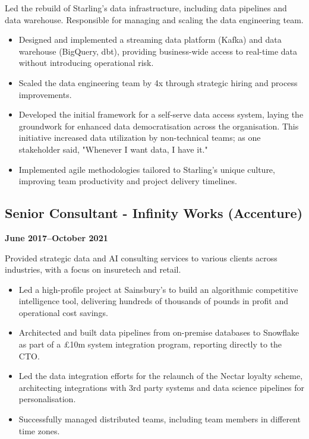 \documentclass[a4paper]{scrartcl}
\begin{document}
Led the rebuild of Starling's data infrastructure, including data pipelines and data warehouse. Responsible for managing and scaling the data engineering team.
\begin{itemize}
	\item Designed and implemented a streaming data platform (Kafka) and data warehouse (BigQuery, dbt), providing business-wide access to real-time data without introducing operational risk.
	\item Scaled the data engineering team by 4x through strategic hiring and process improvements.
	\item Developed the initial framework for a self-serve data access system, laying the groundwork for enhanced data democratisation across the organisation. This initiative increased data utilization by non-technical teams; as one stakeholder said, "Whenever I want data, I have it."
	\item Implemented agile methodologies tailored to Starling's unique culture, improving team productivity and project delivery timelines.
\end{itemize}

\subsection*{Senior Consultant - Infinity Works (Accenture)}
\textbf{June 2017--October 2021}

Provided strategic data and AI consulting services to various clients across industries, with a focus on insuretech and retail.
\begin{itemize}
	\item Led a high-profile project at Sainsbury's to build an algorithmic competitive intelligence tool, delivering hundreds of thousands of pounds in profit and operational cost savings.
	\item Architected and built data pipelines from on-premise databases to Snowflake as part of a £10m system integration program, reporting directly to the CTO.
	\item Led the data integration efforts for the relaunch of the Nectar loyalty scheme, architecting integrations with 3rd party systems and data science pipelines for personalisation.
	\item Successfully managed distributed teams, including team members in different time zones.
\end{itemize}
\end{document}
